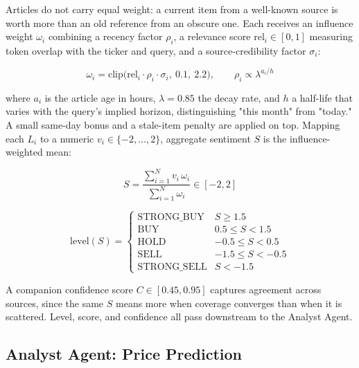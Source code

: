 \documentclass[conference]{IEEEtran}
\begin{document}
Articles do not carry equal weight: a current item from a well-known source is worth more than an old reference from an obscure one. Each receives an influence weight $\omega_i$ combining a recency factor $\rho_i$, a relevance score $\mathrm{rel}_i \in [0,1]$ measuring token overlap with the ticker and query, and a source-credibility factor $\sigma_i$:

\begin{equation}
\omega_i = \mathrm{clip}\bigl(\mathrm{rel}_i \cdot \rho_i \cdot \sigma_i,\ 0.1,\ 2.2\bigr), \qquad \rho_i \propto \lambda^{a_i/h}
\end{equation}

where $a_i$ is the article age in hours, $\lambda=0.85$ the decay rate, and $h$ a half-life that varies with the query's implied horizon, distinguishing "this month" from "today." A small same-day bonus and a stale-item penalty are applied on top. Mapping each $L_i$ to a numeric $v_i \in \{-2,\dots,2\}$, aggregate sentiment $S$ is the influence-weighted mean:

\begin{equation}
S = \frac{\sum_{i=1}^{N} v_i\,\omega_i}{\sum_{i=1}^{N} \omega_i} \in [-2,2]
\end{equation}

\begin{equation}
\mathrm{level}(S) =
\begin{cases}
\text{STRONG\_BUY} & S \geq 1.5 \\
\text{BUY} & 0.5 \leq S < 1.5 \\
\text{HOLD} & -0.5 \leq S < 0.5 \\
\text{SELL} & -1.5 \leq S < -0.5 \\
\text{STRONG\_SELL} & S < -1.5
\end{cases}
\label{eq:level-thresholds}
\end{equation}

A companion confidence score $C \in [0.45, 0.95]$ captures agreement across sources, since the same $S$ means more when coverage converges than when it is scattered. Level, score, and confidence all pass downstream to the Analyst Agent.

\subsection{Analyst Agent: Price Prediction}
\end{document}
